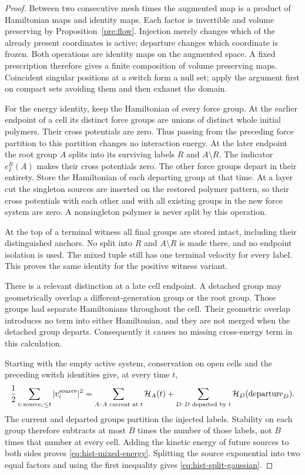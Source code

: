 \begin{proof}
Between two consecutive mesh times the augmented map is a product of
Hamiltonian maps and identity maps.  Each factor is invertible and
volume preserving by Proposition~\ref{pre:flow}.  Injection merely changes
which of the already present coordinates is active; departure changes
which coordinate is frozen.  Both operations are identity maps on the
augmented space.  A fixed prescription therefore gives a finite
composition of volume preserving maps.  Coincident singular positions
at a switch form a null set; apply the argument first on compact sets
avoiding them and then exhaust the domain.

For the energy identity, keep the Hamiltonian of every force group.
At the earlier endpoint of a cell its distinct force groups are unions
of distinct whole initial polymers.  Their cross potentials are zero.
Thus passing from the preceding force partition to this partition
changes no interaction energy.  At the later endpoint the root group
$A$ splits into its surviving labels $R$ and $A\setminus R$.
The indicator $e_I^R(A)$ makes their cross potentials zero.  The other
force groups depart in their entirety.  Store the Hamiltonian of each
departing group at that time.  At a layer cut the singleton sources
are inserted on the restored polymer pattern, so their cross
potentials with each other and with all existing groups in the new
force system are zero.  A nonsingleton polymer is never split by this
operation.

At the top of a terminal witness all final groups are stored intact,
including their distinguished anchors.  No split into $R$ and
$A\setminus R$ is made there, and no endpoint isolation is used.
The mixed tuple still has one terminal velocity for every label.
This proves the same identity for the positive witness variant.

There is a relevant distinction at a late cell endpoint.  A detached
group may geometrically overlap a different-generation group or the
root group.  Those groups had separate Hamiltonians throughout the
cell.  Their geometric overlap introduces no term into either
Hamiltonian, and they are not merged when the detached group departs.
Consequently it causes no missing cross-energy term in this calculation.

Starting with the empty active system, conservation on open cells and
the preceding switch identities give, at every time $t$,
\begin{equation}
 \frac12\sum_{i:\,\text{source}_i\leq t}|v_i^{\rm source}|^2
   =\sum_{\substack{A:\,A\text{ current at }t}}\mathscr H_A(t)
       +\sum_{\substack{D:\,D\text{ departed by }t}}\mathscr H_D(\text{departure}_D).
 \label{eq:hist-energy-ledger}
\end{equation}
The current and departed groups partition the injected labels.  Stability
on each group therefore subtracts at most $B$ times the number of those
labels, not $B$ times that number at every cell.  Adding the kinetic
energy of future sources to both sides proves
\eqref{eq:hist-mixed-energy}.  Splitting the source exponential into
two equal factors and using the first inequality gives
\eqref{eq:hist-split-gaussian}.
\end{proof}

